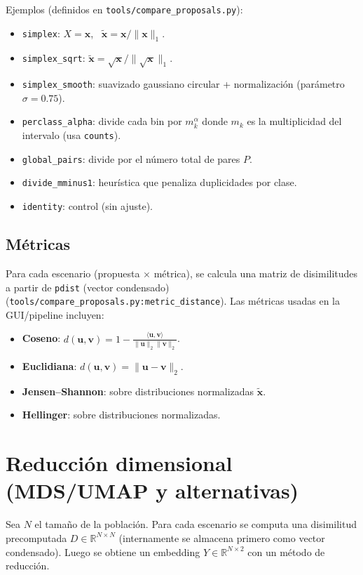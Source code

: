 Ejemplos (definidos en \texttt{tools/compare\_proposals.py}):
\begin{itemize}
  \item \texttt{simplex}: $X=\mathbf{x}$, \ $\tilde{\mathbf{x}}=\mathbf{x}/\|\mathbf{x}\|_1$.
  \item \texttt{simplex\_sqrt}: $\tilde{\mathbf{x}}=\sqrt{\mathbf{x}}/\|\sqrt{\mathbf{x}}\|_1$.
  \item \texttt{simplex\_smooth}: suavizado gaussiano circular + normalización (parámetro $\sigma=0.75$).
  \item \texttt{perclass\_alpha}: divide cada bin por $m_k^\alpha$ donde $m_k$ es la multiplicidad del intervalo (usa \texttt{counts}).
  \item \texttt{global\_pairs}: divide por el número total de pares $P$.
  \item \texttt{divide\_mminus1}: heurística que penaliza duplicidades por clase.
  \item \texttt{identity}: control (sin ajuste).
\end{itemize}

\subsection{Métricas}
Para cada escenario (propuesta $\times$ métrica), se calcula una matriz de disimilitudes a partir de \texttt{pdist} (vector condensado) (\texttt{tools/compare\_proposals.py:metric\_distance}). Las métricas usadas en la GUI/pipeline incluyen:
\begin{itemize}
  \item \textbf{Coseno}: $d(\mathbf{u},\mathbf{v})=1-\frac{\langle \mathbf{u},\mathbf{v}\rangle}{\|\mathbf{u}\|_2\|\mathbf{v}\|_2}$.
  \item \textbf{Euclidiana}: $d(\mathbf{u},\mathbf{v})=\|\mathbf{u}-\mathbf{v}\|_2$.
  \item \textbf{Jensen--Shannon}: sobre distribuciones normalizadas $\tilde{\mathbf{x}}$.
  \item \textbf{Hellinger}: sobre distribuciones normalizadas.
\end{itemize}

\section{Reducción dimensional (MDS/UMAP y alternativas)}
\label{sec:reduccion_dimensional}

Sea $N$ el tamaño de la población. Para cada escenario se computa una disimilitud precomputada $D\in\mathbb{R}^{N\times N}$ (internamente se almacena primero como vector condensado). Luego se obtiene un embedding $Y\in\mathbb{R}^{N\times 2}$ con un método de reducción.

